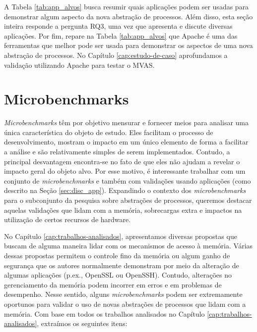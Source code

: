 A Tabela \ref{tab:app_alvos} busca resumir quais aplicações podem ser usadas
para demonstrar algum aspecto da nova abstração de processos. Além disso, esta
seção inteira responde a pergunta RQ3, uma vez que apresenta e discute diversas
aplicações. Por fim, repare na Tabela \ref{tab:app_alvos} que Apache é uma das
ferramentas que melhor pode ser usada para demonstrar os aspectos de uma nova
abstração de processos. No Capítulo \ref{cap:estudo-de-caso} aprofundamos a
validação utilizando Apache para testar o MVAS.



\section{Microbenchmarks}
\label{sec:micro}

\emph{Microbenchmarks} têm por objetivo mensurar e fornecer meios para
analisar uma única característica do objeto de estudo. Eles
facilitam o processo de desenvolvimento,
mostram o impacto em um único elemento de forma a facilitar a análise e são
relativamente simples de serem implementados. Contudo, a principal desvantagem
encontra-se no fato de que eles não ajudam a revelar o impacto geral do objeto
alvo. Por esse motivo, é interessante trabalhar com um conjunto de
\emph{microbenchmarks} e também com validações usando aplicações (como
descrito na Seção \ref{sec:disc_app}). Expandindo o contexto dos
\emph{microbenchmarks} para o subconjunto da pesquisa sobre abstrações de
processos, queremos destacar aquelas validações que lidam com a memória,
sobrecargas extra e impactos na utilização de certos recursos de hardware.

No Capítulo \ref{cap:trabalhos-analisados}, apresentamos diversas propostas que
buscam de alguma maneira lidar com os mecanismos de acesso à memória. Várias
dessas propostas permitem o controle fino da memória ou algum ganho de
segurança que os autores normalmente demonstram por meio da alteração de
algumas aplicações (p.ex., OpenSSL ou OpenSSH). Contudo, alterações no
gerenciamento da memória podem incorrer em erros e em problemas de desempenho.
Nesse sentido, alguns \emph{microbenchmarks} podem ser extremamente oportunos
para validar o uso de novas abstrações de processos que lidam com a memória.
Com base em todos os trabalhos analisados no Capítulo
\ref{cap:trabalhos-analisados}, extraímos os seguintes itens:

